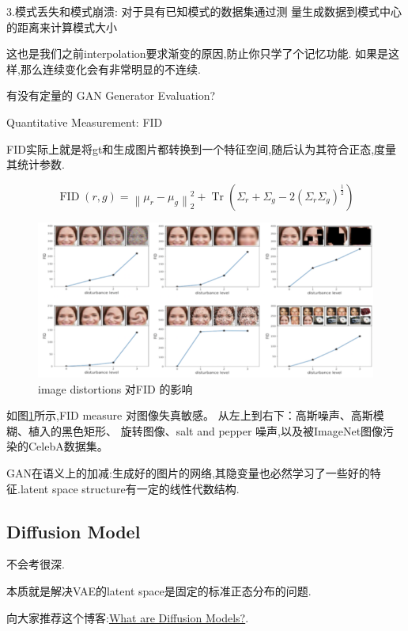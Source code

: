 	3.模式丢失和模式崩溃: 对于具有已知模式的数据集通过测
	量生成数据到模式中心的距离来计算模式大小
	
	这也是我们之前interpolation要求渐变的原因,防止你只学了个记忆功能.
	如果是这样,那么连续变化会有非常明显的不连续.
	
	有没有定量的 GAN Generator Evaluation?

	Quantitative Measurement: FID
	
	FID实际上就是将gt和生成图片都转换到一个特征空间,随后认为其符合正态,度量其统计参数.
	
	\begin{equation}
		\operatorname{FID}(r, g)=\left\|\mu_{r}-\mu_{g}\right\|_{2}^{2}+\operatorname{Tr}\left(\Sigma_{r}+\Sigma_{g}-2\left(\Sigma_{r} \Sigma_{g}\right)^{\frac{1}{2}}\right)
	\end{equation}

	\begin{figure}[htbp]
		\centering
		\includegraphics[scale=0.3]{figures/fid.png}
		\caption{image distortions 对FID 的影响}
		\label{fig:fid}
	\end{figure}

	如图\ref{fig:fid}所示,FID measure 对图像失真敏感。
	从左上到右下：高斯噪声、高斯模糊、植入的黑色矩形、
	旋转图像、salt and pepper 噪声,以及被ImageNet图像污染的CelebA数据集。
	
	GAN在语义上的加减:生成好的图片的网络,其隐变量也必然学习了一些好的特征.latent
	space structure有一定的线性代数结构.
	
	\subsection{Diffusion Model}

	不会考很深.

	本质就是解决VAE的latent space是固定的标准正态分布的问题.

	向大家推荐这个博客:\href{https://lilianweng.github.io/posts/2021-07-11-diffusion-models/}{What are Diffusion Models?}.
